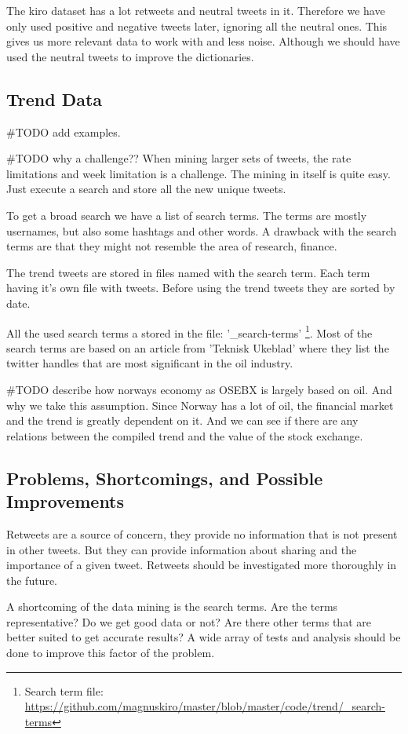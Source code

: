 The kiro dataset has a lot retweets and neutral tweets in it. Therefore we have
only used positive and negative tweets later, ignoring all the neutral ones.
This gives us more relevant data to work with and less noise. Although we
should have used the neutral tweets to improve the dictionaries.
%

\subsection{Trend Data}
#TODO add examples.

#TODO why a challenge??
When mining larger sets of tweets, the rate limitations and week limitation is
a challenge. The mining in itself is quite easy. Just execute a search and store
all the new unique tweets. 

To get a broad search we have a list of search terms. The terms are mostly
usernames, but also some hashtags and other words. A drawback with the search
terms are that they might not resemble the area of research, finance.  

The trend tweets are stored in files named with the search term. Each term
having it's own file with tweets. Before using the trend tweets they are sorted
by date. 

All the used search terms a stored in the file: '\_search-terms'
\footnote{Search term file:
\url{https://github.com/magnuskiro/master/blob/master/code/trend/_search-terms}}.
Most of the search terms are based on an article from 'Teknisk Ukeblad' where
they list the twitter handles that are most significant in the oil industry.

#TODO describe how norways economy as OSEBX is largely based on oil. And why we
take this assumption.  
Since Norway has a lot of oil, the financial market and the trend is greatly
dependent on it. And we can see if there are any relations between the compiled
trend and the value of the stock exchange.  


\subsection{Problems, Shortcomings, and Possible Improvements}
Retweets are a source of concern, they provide no information that is not
present in other tweets. But they can provide information about sharing and the importance of a given tweet. Retweets should be investigated more thoroughly in
the future.  

A shortcoming of the data mining is the search terms. Are the terms
representative? Do we get good data or not? Are there other terms that are
better suited to get accurate results? A wide array of tests and analysis should
be done to improve this factor of the problem. 
%

